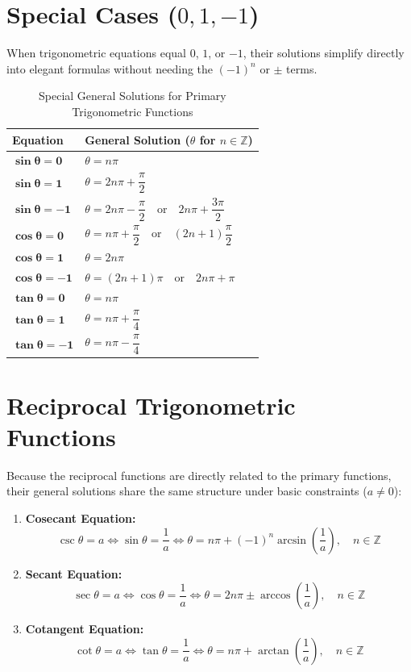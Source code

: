 \documentclass[11pt, a4paper]{article}
\begin{document}
\section{Special Cases ($0, 1, -1$)}
When trigonometric equations equal $0$, $1$, or $-1$, their solutions simplify directly into elegant formulas without needing the $(-1)^n$ or $\pm$ terms.

\begin{table}[htbp]
\centering
\caption{Special General Solutions for Primary Trigonometric Functions}
\vspace{0.2cm}
\begin{tabular}{p{4.5cm} p{10cm}}
\toprule
\textbf{Equation} & \textbf{General Solution} ($\theta$ for $n \in \mathbb{Z}$) \\
\midrule
$\boldsymbol{\sin\theta = 0}$ & $\theta = n\pi$ \\
$\boldsymbol{\sin\theta = 1}$ & $\theta = 2n\pi + \dfrac{\pi}{2}$ \\
$\boldsymbol{\sin\theta = -1}$ & $\theta = 2n\pi - \dfrac{\pi}{2} \quad \text{or} \quad 2n\pi + \dfrac{3\pi}{2}$ \\
\midrule
$\boldsymbol{\cos\theta = 0}$ & $\theta = n\pi + \dfrac{\pi}{2} \quad \text{or} \quad (2n + 1)\dfrac{\pi}{2}$ \\
$\boldsymbol{\cos\theta = 1}$ & $\theta = 2n\pi$ \\
$\boldsymbol{\cos\theta = -1}$ & $\theta = (2n + 1)\pi \quad \text{or} \quad 2n\pi + \pi$ \\
\midrule
$\boldsymbol{\tan\theta = 0}$ & $\theta = n\pi$ \\
$\boldsymbol{\tan\theta = 1}$ & $\theta = n\pi + \dfrac{\pi}{4}$ \\
$\boldsymbol{\tan\theta = -1}$ & $\theta = n\pi - \dfrac{\pi}{4}$ \\
\bottomrule
\end{tabular}
\end{table}

\newpage

\section{Reciprocal Trigonometric Functions}
Because the reciprocal functions are directly related to the primary functions, their general solutions share the same structure under basic constraints ($a \neq 0$):

\begin{enumerate}
    \item \textbf{Cosecant Equation:}
    $$\csc\theta = a \iff \sin\theta = \frac{1}{a} \iff \theta = n\pi + (-1)^n \arcsin\left(\frac{1}{a}\right), \quad n \in \mathbb{Z}$$
    
    \item \textbf{Secant Equation:}
    $$\sec\theta = a \iff \cos\theta = \frac{1}{a} \iff \theta = 2n\pi \pm \arccos\left(\frac{1}{a}\right), \quad n \in \mathbb{Z}$$
    
    \item \textbf{Cotangent Equation:}
    $$\cot\theta = a \iff \tan\theta = \frac{1}{a} \iff \theta = n\pi + \arctan\left(\frac{1}{a}\right), \quad n \in \mathbb{Z}$$
\end{enumerate}
\end{document}
